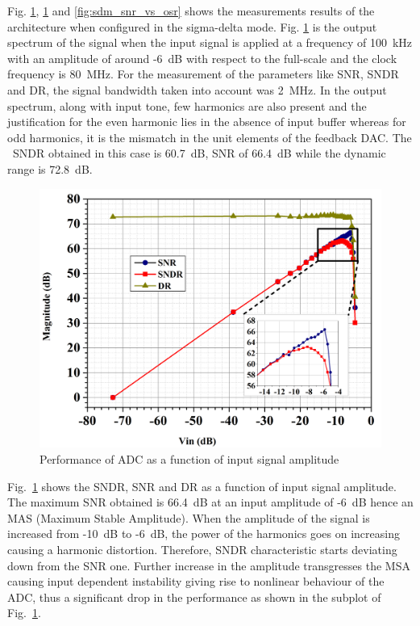 Fig. \ref{fig:sdm_psd}, \ref{fig:sdm_psd} and \ref{fig:sdm_snr_vs_osr} shows the measurements results of the architecture when configured in the sigma-delta mode. Fig. \ref{fig:sdm_psd} is the output spectrum of the signal when the input signal is applied at a frequency of 100~kHz with an amplitude of around -6~dB with respect to the full-scale and the clock frequency is 80~MHz. For the measurement of the parameters like SNR, SNDR and DR, the signal bandwidth taken into account was 2~MHz. In the output spectrum, along with input tone, few harmonics are also present and the justification for the even harmonic lies in the absence of input buffer whereas for odd harmonics, it is the mismatch in the unit elements of the feedback DAC. The \ SNDR obtained in this case is 60.7~dB, SNR of 66.4~dB while the dynamic range is 72.8~dB. 
%
\begin{figure}[h!]
    \centering
    \includegraphics[width=0.8\columnwidth]{Chap06/Figures/snr_vs_vin_sd.jpg}
    \caption{Performance of \textSigma \textDelta ADC as a function of input signal amplitude }
    \label{fig:sdm_psd}
\end{figure}
%

Fig.~\ref{fig:sdm_psd} shows the SNDR, SNR and DR as a function of input signal amplitude. The maximum SNR obtained is 66.4~dB at an input amplitude of -6~dB hence an MAS (Maximum Stable Amplitude). When the amplitude of the signal is increased from -10~dB to -6~dB, the power of the harmonics goes on increasing causing a harmonic distortion. Therefore, SNDR characteristic starts deviating down from the SNR one. Further increase in the amplitude transgresses the MSA causing input dependent instability giving rise to nonlinear behaviour of the ADC, thus a significant drop in the performance as shown in the subplot of Fig.~\ref{fig:sdm_psd}.

